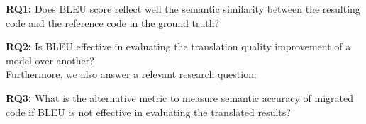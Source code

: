 {\bf RQ1:} Does BLEU score reflect well the semantic similarity between
the resulting code and the reference code in the ground truth?

{\bf RQ2:} Is BLEU effective in evaluating the translation quality 
improvement of a model over another?\\
Furthermore, we also answer a relevant research question:

{\bf RQ3:} What is the alternative metric to measure semantic accuracy
of migrated code if BLEU is not effective in evaluating the translated results?

